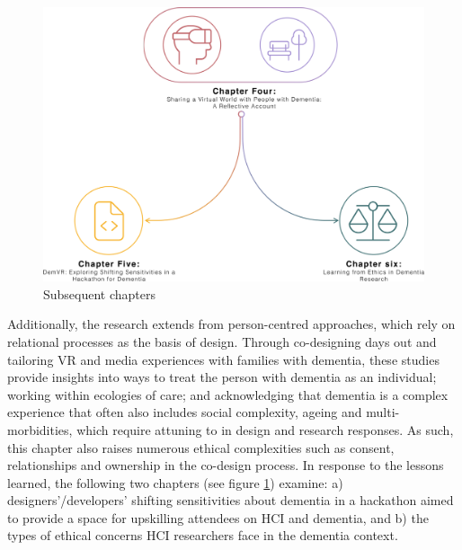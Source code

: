 \begin{figure}[htp]
\centering
\includegraphics[width=0.6\linewidth]{Images/Thesis_Narrative/Narrative_ChapterFour.png}
\caption{Subsequent chapters}
\label{fig:ChapterFour_FutureStudies}
\end{figure}

Additionally, the research extends from person-centred approaches, which rely on relational processes as the basis of design. Through co-designing days out and tailoring VR and media experiences with families with dementia, these studies provide insights into ways to treat the person with dementia as an individual; working within ecologies of care; and acknowledging that dementia is a complex experience that often also includes social complexity, ageing and multi-morbidities, which require attuning to in design and research responses. As such, this chapter also raises numerous ethical complexities such as consent, relationships and ownership in the co-design process. In response to the lessons learned, the following two chapters (see figure \ref{fig:ChapterFour_FutureStudies}) examine: a) designers'/developers' shifting sensitivities about dementia in a hackathon aimed to provide a space for upskilling attendees on HCI and dementia, and b) the types of ethical concerns HCI researchers face in the dementia context.






